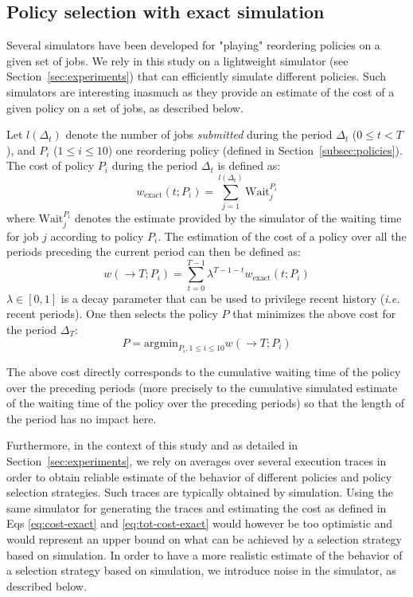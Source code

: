 \documentclass[sigconf]{acmart}
\begin{document}
\subsection{Policy selection with exact simulation}
\label{sub:feedback}

Several simulators have been developed for "playing" reordering policies on a given set of jobs. We rely in this study on a lightweight simulator (see Section~\ref{sec:experiments}) that can efficiently simulate different policies. Such simulators are interesting inasmuch as they provide an estimate of the cost of a given policy on a set of jobs, as described below.

Let $l(\Delta_t)$ denote the number of jobs \textit{submitted} during the period $\Delta_t$ ($0 \le t < T$), and $P_i$ ($1 \le i \le 10$) one reordering policy (defined in Section~\ref{subsec:policies}). The cost of policy $P_i$ during the period $\Delta_t$ is defined as:
%
\begin{equation}
\label{eq:cost-exact}
w_{\mbox{exact}}(t;P_i) = \sum_{j=1}^{l(\Delta_t)} \mbox{Wait}_j^{P_i}
\end{equation}
%
where $\mbox{Wait}_j^{P_i}$ denotes the estimate provided by the simulator of the waiting time for job $j$ according to policy $P_i$. The estimation of the cost of a policy over all the periods preceding the current period can then be defined as:
%
\begin{equation}
\label{eq:tot-cost-exact}
w(\rightarrow T;P_i) = \sum_{t=0}^{T-1} \lambda^{T-1-t} w_{\mbox{exact}}(t;P_i)
\end{equation}
%
$\lambda \in [0,1]$ is a decay parameter that can be used to privilege recent history (\textit{i.e.} recent periods). One then selects the policy $P$ that minimizes the above cost for the period $\Delta_T$:
%
\begin{equation}
\label{eq:select-exact}
P = \mbox{argmin}_{P_i, 1 \le i \le 10} w(\rightarrow T;P_i)
\end{equation}

The above cost directly corresponds to the cumulative waiting time of the policy over the preceding periods (more precisely to the cumulative simulated estimate of the waiting time of the policy over the preceding periods) so that the length of the period has no impact here.

Furthermore, in the context of this study and as detailed in Section~\ref{sec:experiments}, we rely on averages over several execution traces in order to obtain reliable estimate of the behavior of different policies and policy selection strategies. Such traces are typically obtained by simulation. Using the same simulator for generating the traces and estimating the cost as defined in Eqs \ref{eq:cost-exact} and \ref{eq:tot-cost-exact} would however be too optimistic and would represent an upper bound on what can be achieved by a selection strategy based on simulation. In order to have a more realistic estimate of the behavior of a selection strategy based on simulation, we introduce noise in the simulator, as described below.
\end{document}
